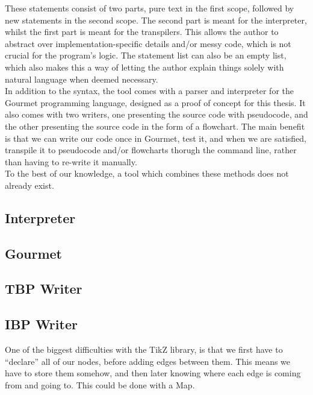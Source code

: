 These statements consist of two parts, pure text in the first scope, followed by new statements in the second scope. The second part is meant for the interpreter, whilst the first part is meant for the transpilers. This allows the author to abstract over implementation-specific details and/or messy code, which is not crucial for the program's logic. The statement list can also be an empty list, which also makes this a way of letting the author explain things solely with natural language when deemed necessary. \hfill \\

In addition to the syntax, the tool comes with a parser and interpreter for the Gourmet programming language, designed as a proof of concept for this thesis. It also comes with two writers, one presenting the source code with pseudocode, and the other presenting the source code in the form of a flowchart. The main benefit is that we can write our code once in Gourmet, test it, and when we are satisfied, transpile it to pseudocode and/or flowcharts thorugh the command line, rather than having to re-write it manually. \hfill \\

To the best of our knowledge, a tool which combines these methods does not already exist.

\subsection{Interpreter}

\subsection{Gourmet}

\subsection{TBP Writer}

\subsection{IBP Writer}

One of the biggest difficulties with the TikZ library, is that we first have to ``declare'' all of our nodes, before adding edges between them. This means we have to store them somehow, and then later knowing where each edge is coming from and going to. This could be done with a Map. \\

